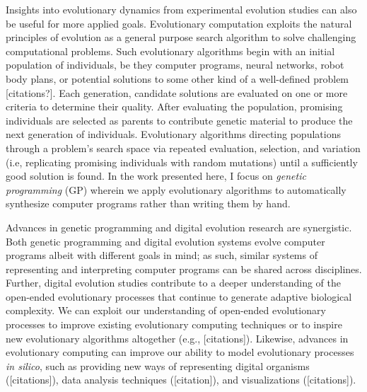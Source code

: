 
Insights into evolutionary dynamics from experimental evolution studies can also be useful for more applied goals.
Evolutionary computation exploits the natural principles of evolution as a general purpose search algorithm to solve challenging computational problems.
Such evolutionary algorithms begin with an initial population of individuals, be they computer programs, neural networks, robot body plans, or potential solutions to some other kind of a well-defined problem [citations?].
Each generation, candidate solutions are evaluated on one or more criteria to determine their quality. 
After evaluating the population, promising individuals are selected as parents to contribute genetic material to produce the next generation of individuals.
Evolutionary algorithms directing populations through a problem's search space via repeated evaluation, selection, and variation (i.e, replicating promising individuals with random mutations) until a sufficiently good solution is found. 
In the work presented here, I focus on \textit{genetic programming} (GP) wherein we apply evolutionary algorithms to automatically synthesize computer programs rather than writing them by hand.

Advances in genetic programming and digital evolution research are synergistic.
Both genetic programming and digital evolution systems evolve computer programs albeit with different goals in mind; as such, similar systems of representing and interpreting computer programs can be shared across disciplines.
Further, digital evolution studies contribute to a deeper understanding of the open-ended evolutionary processes that continue to generate adaptive biological complexity. 
We can exploit our understanding of open-ended evolutionary processes to improve existing evolutionary computing techniques or to inspire new evolutionary algorithms altogether (e.g., [citations]).   
Likewise, advances in evolutionary computing can improve our ability to model evolutionary processes \textit{in silico}, such as providing new ways of representing digital organisms ([citations]), data analysis techniques ([citation]), and visualizations ([citations]). 


